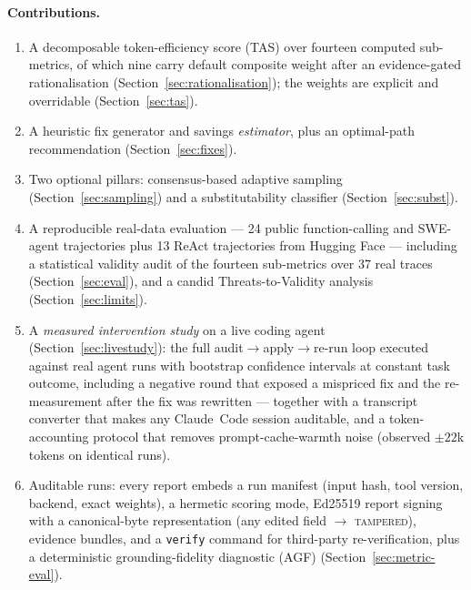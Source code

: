 \documentclass[11pt]{article}
\newcommand{\code}[1]{\texttt{#1}}
\begin{document}
\paragraph{Contributions.}
\begin{enumerate}[leftmargin=*]
  \item A decomposable token-efficiency score (TAS) over fourteen computed
        sub-metrics, of which nine carry default composite weight after an
        evidence-gated rationalisation (Section~\ref{sec:rationalisation});
        the weights are explicit and overridable (Section~\ref{sec:tas}).
  \item A heuristic fix generator and savings \emph{estimator}, plus an optimal-path
        recommendation (Section~\ref{sec:fixes}).
  \item Two optional pillars: consensus-based adaptive sampling
        (Section~\ref{sec:sampling}) and a substitutability classifier
        (Section~\ref{sec:subst}).
  \item A reproducible real-data evaluation --- 24 public function-calling and
        SWE-agent trajectories plus 13 ReAct trajectories from Hugging Face ---
        including a statistical validity audit of the fourteen sub-metrics over
        37 real traces (Section~\ref{sec:eval}), and a candid
        Threats-to-Validity analysis (Section~\ref{sec:limits}).
  \item A \emph{measured intervention study} on a live coding agent
        (Section~\ref{sec:livestudy}): the full audit$\to$apply$\to$re-run loop
        executed against real agent runs with bootstrap confidence intervals at
        constant task outcome, including a negative round that exposed a
        mispriced fix and the re-measurement after the fix was rewritten ---
        together with a transcript converter that makes any Claude~Code session
        auditable, and a token-accounting protocol that removes
        prompt-cache-warmth noise (observed $\pm22$k tokens on identical runs).
  \item Auditable runs: every report embeds a run manifest (input hash, tool
        version, backend, exact weights), a hermetic scoring mode, Ed25519
        report signing with a canonical-byte representation (any edited field
        $\to$ \textsc{tampered}), evidence bundles, and a
        \code{verify} command for third-party re-verification, plus a
        deterministic grounding-fidelity diagnostic (AGF)
        (Section~\ref{sec:metric-eval}).
\end{enumerate}
\end{document}
